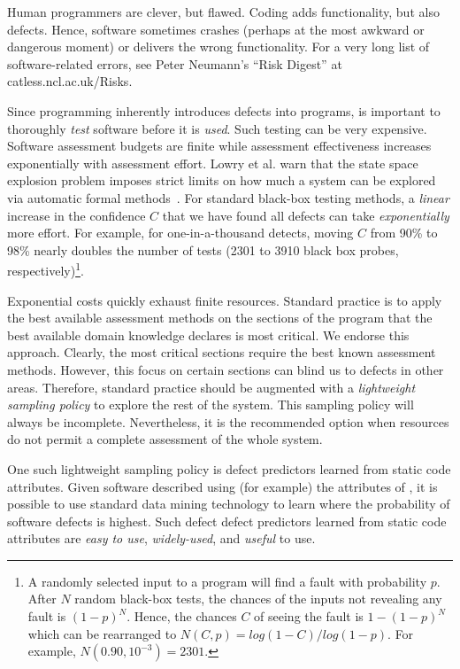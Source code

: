 
Human programmers are clever, but flawed. Coding  adds functionality, but also defects.
Hence, software sometimes crashes (perhaps at the most awkward or dangerous moment) or delivers
the wrong functionality. For a very long list of software-related errors,
see  Peter Neumann's ``Risk Digest'' at catless.ncl.ac.uk/Risks.

Since programming inherently
introduces defects into  programs, is important to thoroughly {\em test} software before it is {\em used}.
Such testing  can be very expensive.
Software assessment budgets are finite
while assessment effectiveness increases 
exponentially with assessment effort.
Lowry et al. warn that  
the state space explosion problem imposes
strict limits on how much a system can be explored
via automatic formal methods~\cite{lowrey98}.
For standard black-box testing methods,
a {\em linear} increase
in the confidence $C$ that we have found all defects
can take {\em exponentially} more effort.
For example, for one-in-a-thousand detects,
moving $C$ from  
90\% to 98\% nearly doubles the number of  tests (2301 to   3910 black box
probes, respectively)\footnote{A randomly selected 
input to a program will find a fault with probability $p$.
After $N$ random black-box tests, the chances of the inputs 
not revealing any fault 
is $(1-p)^N$. Hence, the chances $C$ of seeing the fault is $1-(1-p)^N$
which can be rearranged to 
 $N(C,p)=log(1 -
C)/log(1-p)$. For example, $N(0.90,10^{-3})=2301$.}.

Exponential costs quickly exhaust finite resources.
Standard practice is to apply the best
available assessment methods on the sections of the program that the
best available domain knowledge declares is most critical.  We endorse
this approach.  Clearly, the most critical sections require the best
known assessment methods. However, this focus on certain sections
can blind us to defects in other areas.
Therefore, standard practice should be augmented
with a  {\em
lightweight sampling policy} to explore the rest of the system.  This
sampling policy will always be incomplete.
Nevertheless, it is the recommended option when
resources do not permit a complete assessment of the whole system.

One such lightweight sampling policy is defect predictors learned from static code attributes.
Given software described using (for example) the attributes of , it is possible
to use standard data mining technology to learn where the probability of software defects is highest.
Such defect  defect predictors learned from
static code attributes are   {\em easy to
use}, {\em widely-used}, and {\em useful} to use.

